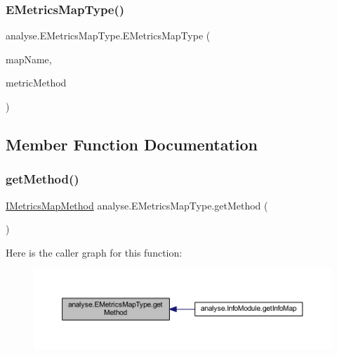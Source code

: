 \subsubsection{\texorpdfstring{E\+Metrics\+Map\+Type()}{EMetricsMapType()}}
{\footnotesize\ttfamily analyse.\+E\+Metrics\+Map\+Type.\+E\+Metrics\+Map\+Type (\begin{DoxyParamCaption}\item[{String}]{map\+Name,  }\item[{\mbox{\hyperlink{interfaceanalyse_1_1map_methods_1_1_i_metrics_map_method}{I\+Metrics\+Map\+Method}}}]{metric\+Method }\end{DoxyParamCaption})\hspace{0.3cm}{\ttfamily [inline]}}



\subsection{Member Function Documentation}
\mbox{\label{enumanalyse_1_1_e_metrics_map_type_adf55461cd7840ed3c5a0d660915ef48a}} 
\subsubsection{\texorpdfstring{get\+Method()}{getMethod()}}
{\footnotesize\ttfamily \mbox{\hyperlink{interfaceanalyse_1_1map_methods_1_1_i_metrics_map_method}{I\+Metrics\+Map\+Method}} analyse.\+E\+Metrics\+Map\+Type.\+get\+Method (\begin{DoxyParamCaption}{ }\end{DoxyParamCaption})\hspace{0.3cm}{\ttfamily [inline]}}

Here is the caller graph for this function\+:
\nopagebreak
\begin{figure}[H]
\begin{center}
\leavevmode
\includegraphics[width=350pt]{enumanalyse_1_1_e_metrics_map_type_adf55461cd7840ed3c5a0d660915ef48a_icgraph}
\end{center}
\end{figure}
\mbox{\label{enumanalyse_1_1_e_metrics_map_type_aab3de28ad6049093073fdcb7f7e2b55e}} 
